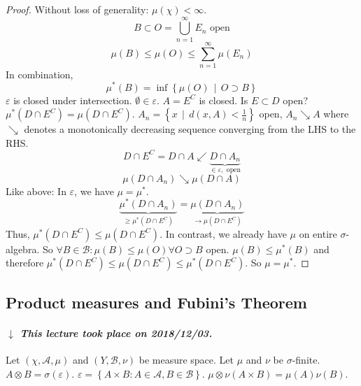 \documentclass[a4paper]{article}
\numberwithin{lecref}{section}
\theoremstyle{break}
\newcommand{\dateref}[1]{%
  \begin{mdframed}[backgroundcolor=gray!10,innerbottommargin=0pt,innertopmargin=0pt]
    \paragraph{\textit{$\downarrow$ This lecture took place on #1.}}%
  \end{mdframed}%
}
\newcommand{\Set}[1]{\left\{#1\right\}}
\newcommand{\SetDef}[2]{\left\{#1\,\mid\,#2\right\}}
\begin{document}
\begin{proof}
  Without loss of generality: $\mu(\chi) < \infty$.
  \[ B \subset O = \bigcup_{n=1}^\infty E_n \text{ open} \]
  \[ \mu(B) \leq \mu(O) \leq \sum_{n=1}^\infty \mu(E_n) \]
  In combination,
  \[ \mu^*(B) = \inf\SetDef{\mu(O)}{O \supset B} \]
  $\varepsilon$ is closed under intersection. $\emptyset \in \varepsilon$.
  $A = E^C$ is closed. Is $E \subset D$ open? $\mu^*(D \cap E^C) = \mu(D \cap E^C)$.
  $A_n = \SetDef{x}{d(x, A) < \frac1n}$ open, $A_n \searrow A$
  where $\searrow$ denotes a monotonically decreasing sequence converging from the LHS to the RHS.
  \[ D \cap E^C = D \cap A \swarrow \underbrace{D \cap A_n}_{\in \varepsilon, \text{ open}} \]
  \[ \mu(D \cap A_n) \searrow \mu(D \cap A) \]
  Like above: In $\varepsilon$, we have $\mu = \mu^*$.
  \[ \underbrace{\mu^*(D \cap A_n)}_{\geq \mu^*(D \cap E^C)} = \underbrace{\mu(D \cap A_n)}_{\to \mu(D \cap E^C)} \]
  Thus, $\mu^*(D \cap E^C) \leq \mu(D \cap E^C)$.
  In contrast, we already have $\mu$ on entire $\sigma$-algebra. So $\forall B \in \mathcal B: \mu(B) \leq \mu(O) \forall O \supset B$ open. $\mu(B) \leq \mu^*(B)$ and therefore $\mu^*(D \cap E^C) \leq \mu(D \cap E^C) \leq \mu^*(D \cap E^C)$.
  So $\mu = \mu^*$.
\end{proof}

\subsection{Product measures and Fubini's Theorem}

\dateref{2018/12/03}

Let $(\chi, \mathcal A, \mu)$ and $(Y, \mathcal B, \nu)$ be measure space.
Let $\mu$ and $\nu$ be $\sigma$-finite.
$A \otimes B = \sigma(\varepsilon)$. $\varepsilon = \Set{A \times B: A \in \mathcal A, B \in \mathcal B}$.
$\mu \otimes \nu (A \times B) = \mu(A) \nu(B)$.
\end{document}
